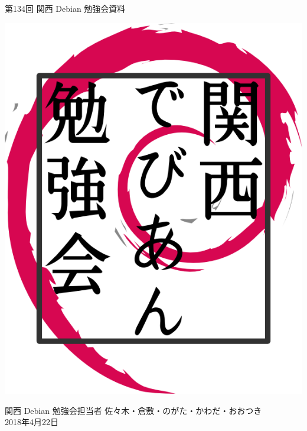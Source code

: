 \documentclass[mingoth,a4paper]{jsarticle}
\newcommand{\debmtgyear}{2018}
\newcommand{\debmtgdate}{22}
\newcommand{\debmtgmonth}{4}
\newcommand{\debmtgnumber}{134}
\begin{document}
\begin{titlepage}


 第\debmtgnumber{}回 関西 Debian 勉強会資料

\vspace{2cm}

\begin{center}
\includegraphics{image200802/kansaidebianlogo.png}
\end{center}

\begin{flushright}
\hfill{}関西 Debian 勉強会担当者 佐々木・倉敷・のがた・かわだ・おおつき \\
\hfill{}\debmtgyear{}年\debmtgmonth{}月\debmtgdate{}日
\end{flushright}

\thispagestyle{empty}
\end{titlepage}

\end{document}
